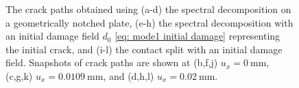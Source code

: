 \begin{figure}[htb!]
\begin{subfigure}[b]{0.06\textwidth}
    \vspace{0.15in}
  \end{subfigure}
  \caption{The crack paths obtained using (a-d) the spectral decomposition on a geometrically notched plate, (e-h) the spectral decomposition with an initial damage field $d_0$ \eqref{eq: mode1 initial damage} representing the initial crack, and (i-l) the contact split with an initial damage field. Snapshots of crack paths are shown at (b,f,j) $u_x = \SI{0}{\milli\meter}$, (c,g,k) $u_x = \SI{0.0109}{\milli\meter}$, and (d,h,l) $u_x = \SI{0.02}{\milli\meter}$. }
  \label{fig: Chapter4/mode2_crack_path}
\end{figure}
